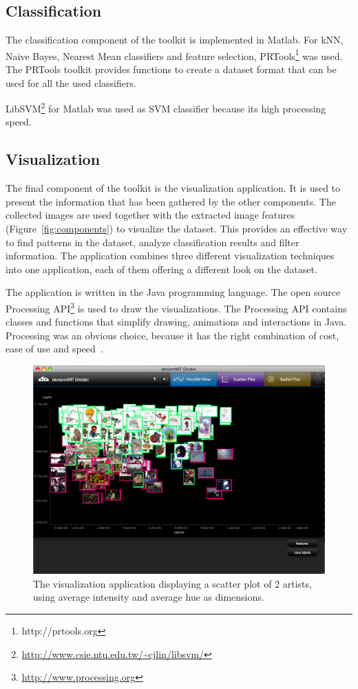 \subsection{Classification}
The classification component of the toolkit is implemented in Matlab.
For kNN, Naive Bayes, Nearest Mean classifiers and feature selection, PRTools\footnote{http://prtools.org} \cite{Duin00prtoolsversion} was used.
The PRTools toolkit provides functions to create a dataset format that can be used for all the used classifiers.

LibSVM\footnote{\url{http://www.csie.ntu.edu.tw/~cjlin/libsvm/}} \cite{chang2001libsvm} for Matlab was used as SVM classifier because its high processing speed.


\subsection{Visualization}
The final component of the toolkit is the visualization application.
It is used to present the information that has been gathered by the other components.
The collected images are used together with the extracted image features (Figure~\ref{fig:components}) to visualize the dataset.
This provides an effective way to find patterns in the dataset, analyze classification results and filter information.
The application combines three different visualization techniques into one application, each of them offering a different look on the dataset.

The application is written in the Java programming language.
The open source Processing API\footnote{\url{http://www.processing.org}} is used to draw the visualizations.
The Processing API contains classes and functions that simplify drawing, animations and interactions in Java.
Processing was an obvious choice, because it has the right combination of cost, ease of use and speed~\cite{fry08}.

\begin{figure}[htb]
  \centering
  \includegraphics[width=1\linewidth]{img/visualization_scatter.png}
  \caption{The visualization application displaying a scatter plot of 2 artists, using average intensity and average hue as dimensions.}
  \label{fig:visualization_scatter}
\end{figure}

